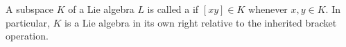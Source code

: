 A subspace $K$ of a Lie algebra $L$ is called a  if $[xy] \in K$ whenever $x, y \in K$. In particular, $K$ is a Lie algebra in its own right relative to the inherited bracket operation.
